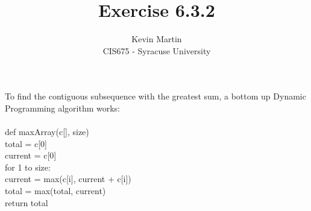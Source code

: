\documentclass{article}
\author{Kevin Martin\\ CIS675 - Syracuse University}
\title{Exercise 6.3.2}
\newcommand\tab[1][1cm]{\hspace*{#1}}
\begin{document}
\maketitle
To find the contiguous subsequence with the greatest sum, a bottom up Dynamic Programming 
algorithm works:\\\\
def maxArray(c[], size)\\
\tab total = c[0]\\
\tab current = c[0]\\
\tab for 1 to size:\\
\tab \tab current = max(c[i], current + c[i])\\
\tab \tab total = max(total, current)\\
\tab return total
\end{document}
